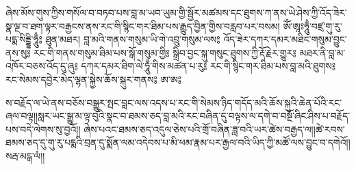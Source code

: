 {ཞེས་མོས་གུས་ཀྱིས་གསོལ་བ་བཏབ་པས་བླ་མ་ཡབ་ཡུམ་གྱི་སྦྱོར་མཚམས་དང་ཐུགས་ཀ་ནས་ཡེ་ཤེས་ཀྱི་འོད་ཟེར་སྣ་ལྔ་བ་ཐག་ལྟར་བརྒྱངས་ནས་རང་གི་སྙིང་གར་ཐིམ་པས་རྒྱུད་བྱིན་གྱིས་བརླབ་པར་བསམ།}
{
  \LARGE
  ཨོཾ་ཨཱཿཧཱུྃ་བཛྲ་གུ་རུ་པདྨ་སིདྡྷི་ཧཱུྃ༔
}
{ཐུན་མཐར།}
{
  \Large
  བླ་མའི་གནས་གསུམ་ཡི་གེ་འབྲུ་གསུམ་ལས༔
  འོད་ཟེར་དཀར་དམར་མཐིང་གསུམ་བྱུང་ནས་སུ༔
  རང་གི་གནས་གསུམ་ཐིམ་པས་སྒོ་གསུམ་གྱི༔
  སྒྲིབ་བྱང་སྐུ་གསུང་ཐུགས་ཀྱི་རྡོ་རྗེར་གྱུར༔
  མཐར་ནི་བླ་མ་འཁོར་བཅས་འོད་དུ་ཞུ༔
  དཀར་དམར་ཐིག་ལེ་ཧཱུྃ་གིས་མཚན་པ་རུ༔
  རང་གི་སྙིང་གར་ཐིམ་པས་བླ་མའི་ཐུགས༔
  རང་སེམས་དབྱེར་མེད་ལྷན་སྐྱེས་ཆོས་སྐུར་གནས༔
  ཨ་ཨ༔
}

ས་བརྗོད་ལ་ཡེ་ནས་བཅོས་བསྒྱུར་སྤང་བླང་ལས་འདས་པ་རང་གི་སེམས་ཉིད་གདོད་མའི་ཆོས་སྐུའི་ཆེན་པོའི་རང་ཞལ་བལྟ།།སླར་ཡང་སྒྱུ་མ་ལྟ་བུའི་སྣང་བ་ཐམས་ཅད་བླ་མའི་རང་བཞིན་དུ་བལྟས་ལ་དགེ་བ་བསྔོ་ཞིང་ཤིས་པ་བརྗོད་པས་བདེ་ལེགས་སུ་བྱའོ།།
ཞེས་པའང་ཐམས་ཅད་འདུལ་ཅེས་པའི་གྲོ་བཞིན་ཟླ་བའི་ཡར་ཚེས་བརྒྱད་ལ།།ཚེ་རབས་ཐམས་ཅད་དུ་གུ་རུ་པདྨའི་བྲན་དུ་སྨོན་ལམ་འདེབས་པ་མི་ཕམ་རྣམ་པར་རྒྱལ་བའི་ཡིད་ཀྱི་མཚོ་ལས་བྱུང་བ་དགེའོ།།
སརྦ་མངྒ་ལཾ།།

